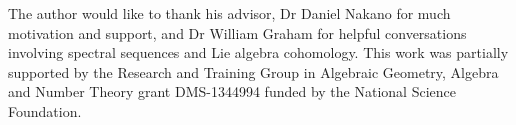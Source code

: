 \documentclass[12pt]{report}
\begin{document}
\begin{abstract}

\end{abstract}

\maketitle    %






The author would like to thank his advisor, Dr Daniel Nakano for much motivation and support, and Dr William Graham for helpful conversations involving spectral sequences and Lie algebra cohomology. This work was partially supported by the Research and Training Group in Algebraic Geometry, Algebra and Number Theory grant DMS-1344994 funded by the National Science Foundation.

\end{document}
